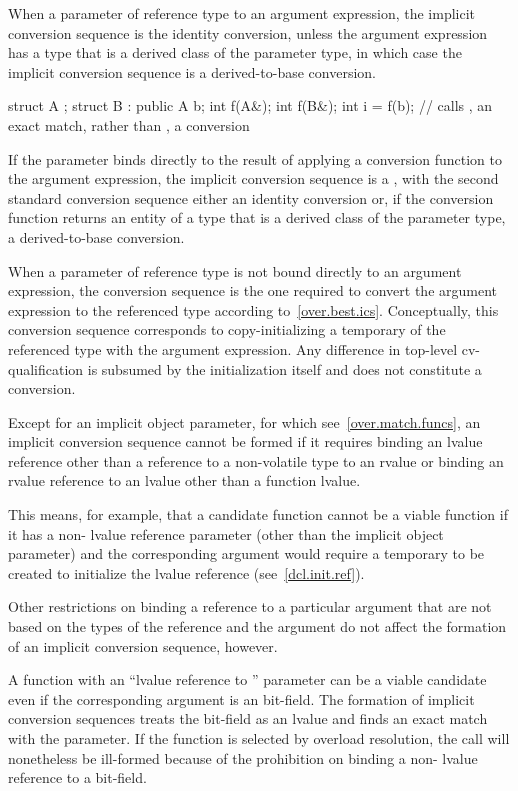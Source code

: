 \pnum
When a parameter of reference type  to an
argument expression, the implicit conversion sequence is the identity conversion,
unless the argument expression has a type that is a derived class of the parameter
type, in which case the implicit conversion sequence is a derived-to-base
conversion.
\begin{example}
\begin{codeblock}
struct A {};
struct B : public A {} b;
int f(A&);
int f(B&);
int i = f(b);       // calls , an exact match, rather than , a conversion
\end{codeblock}
\end{example}
If the parameter binds directly to the result of
applying a conversion function to the argument expression, the implicit
conversion sequence is a ,
with the second standard conversion sequence either an identity conversion or,
if the conversion function returns an entity of a type that is a derived class
of the parameter type, a derived-to-base conversion.

\pnum
When a parameter of reference type is not bound directly to an argument
expression, the conversion sequence is the one required to convert the argument
expression to the referenced type according to~\ref{over.best.ics}.
Conceptually, this conversion sequence corresponds to copy-initializing a
temporary of the referenced type with the argument expression.
Any difference
in top-level cv-qualification is subsumed by the initialization itself and
does not constitute a conversion.

\pnum
Except for an implicit object parameter, for which see~\ref{over.match.funcs},
an implicit conversion sequence cannot be formed if it requires
binding an lvalue reference
other than a reference to a non-volatile  type
to an rvalue
or binding an rvalue reference to an lvalue other than a function lvalue.
\begin{note}
This means, for example, that a candidate function cannot be a viable
function if it has a non- lvalue reference parameter (other than
the implicit object parameter) and the corresponding argument
would require a temporary to be created to initialize the lvalue
reference (see~\ref{dcl.init.ref}).
\end{note}

\pnum
Other restrictions on binding a reference to a particular argument
that are not based on the types of the reference and the argument
do not affect the formation of an implicit conversion
sequence, however.
\begin{example}
A function with an ``lvalue reference to '' parameter can
be a viable candidate even if the corresponding argument is an
bit-field.
The formation of implicit conversion sequences
treats the
bit-field as an
lvalue and finds an exact
match with the parameter.
If the function is selected by overload
resolution, the call will nonetheless be ill-formed because of
the prohibition on binding a non- lvalue reference to a bit-field.
\end{example}

